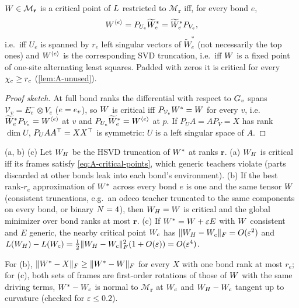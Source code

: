 \begin{proposition}\label{prop:A-critical-points}
  \proven{} 
  $W\in\mathcal M_{\mathbf r}$ is a critical point of $L$ restricted to $\mathcal M_{\mathbf r}$ iff, for every bond $e$,
  \begin{equation}\label{eq:A-critical-points}
    W^{\langle e\rangle}=P_{U_e}\widetilde W^*_e=\widetilde W^*_eP_{V_e},
  \end{equation}
  i.e.\ iff $U_e$ is spanned by $r_e$ left singular vectors of $\widetilde W^*_e$ (not necessarily the top ones)
  and $W^{\langle e\rangle}$ is the corresponding SVD truncation, i.e.\ iff $W$ is a fixed point of one-site
  alternating least squares. Padded with zeros it is critical for every $\chi_{e}\ge r_e$ (\cref{lem:A-unused}).
\end{proposition}
\begin{proof}[Proof sketch]
  At full bond ranks the differential with respect to $G_{v}$ spans $\mathcal V_v=E^-_{e}\otimes V_e$ ($e=e_{v}$), so $W$
  is critical iff $P_{\mathcal V_v}W^{*}=W$ for every $v$, i.e.\ $\widetilde W^*_eP_{V_e}=W^{\langle e\rangle}$ at $v$ and $P_{U_e}\widetilde W^*_e=W^{\langle e\rangle}$
  at $p$. If $P_UA=AP_V=X$ has rank $\dim U$, $P_UAA^{\top}=XX^{\top}$ is symmetric: $U$ is a left singular space of $A$.
\end{proof}

\begin{proposition}\label{prop:A-hsvd}
  \proven{} (a, b) \derived{} (c) 
  Let $W_H$ be the HSVD truncation of $W^{*}$ at ranks $\mathbf r$. (a) $W_H$ is critical iff its frames satisfy
  \eqref{eq:A-critical-points}, which generic teachers violate (parts discarded at other bonds leak into
  each bond's environment). (b) If the best rank-$r_e$
  approximation of $W^{*}$ across every bond $e$ is one and the same tensor $W$ (consistent truncations,
  e.g.\ an odeco teacher truncated to the same components on every bond, or binary $N=4$), then
  $W_H=W$ is critical and the global minimizer over bond ranks at most $\mathbf r$. (c) If $W^{*}=W+\varepsilon E$
  with $W$ consistent and $E$ generic, the nearby critical point $W_c$ has $\lVert W_H-W_c\rVert_{F}=O(\varepsilon^2)$
  and $L(W_H)-L(W_c)=\tfrac12\lVert W_H-W_c\rVert_{F}^2(1+O(\varepsilon))=O(\varepsilon^4)$.
\end{proposition}
For (b), $\lVert W^{*}-X\rVert_{F}\ge\lVert W^{*}-W\rVert_{F}$ for every $X$ with one bond rank at most $r_e$; for (c), both sets of
frames are first-order rotations of those of $W$ with the same driving terms, $W^{*}-W_c$ is normal to
$\mathcal M_{\mathbf r}$ at $W_c$ and $W_H-W_c$ tangent up to curvature (checked for $\varepsilon\le0.2$).

